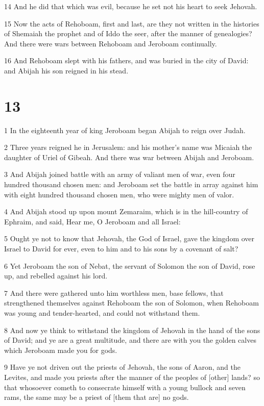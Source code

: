 \par 14 And he did that which was evil, because he set not his heart to seek Jehovah.
\par 15 Now the acts of Rehoboam, first and last, are they not written in the histories of Shemaiah the prophet and of Iddo the seer, after the manner of genealogies? And there were wars between Rehoboam and Jeroboam continually.
\par 16 And Rehoboam slept with his fathers, and was buried in the city of David: and Abijah his son reigned in his stead.

\chapter{13}

\par 1 In the eighteenth year of king Jeroboam began Abijah to reign over Judah.
\par 2 Three years reigned he in Jerusalem: and his mother's name was Micaiah the daughter of Uriel of Gibeah. And there was war between Abijah and Jeroboam.
\par 3 And Abijah joined battle with an army of valiant men of war, even four hundred thousand chosen men: and Jeroboam set the battle in array against him with eight hundred thousand chosen men, who were mighty men of valor.
\par 4 And Abijah stood up upon mount Zemaraim, which is in the hill-country of Ephraim, and said, Hear me, O Jeroboam and all Israel:
\par 5 Ought ye not to know that Jehovah, the God of Israel, gave the kingdom over Israel to David for ever, even to him and to his sons by a covenant of salt?
\par 6 Yet Jeroboam the son of Nebat, the servant of Solomon the son of David, rose up, and rebelled against his lord.
\par 7 And there were gathered unto him worthless men, base fellows, that strengthened themselves against Rehoboam the son of Solomon, when Rehoboam was young and tender-hearted, and could not withstand them.
\par 8 And now ye think to withstand the kingdom of Jehovah in the hand of the sons of David; and ye are a great multitude, and there are with you the golden calves which Jeroboam made you for gods.
\par 9 Have ye not driven out the priests of Jehovah, the sons of Aaron, and the Levites, and made you priests after the manner of the peoples of [other] lands? so that whosoever cometh to consecrate himself with a young bullock and seven rams, the same may be a priest of [them that are] no gods.
